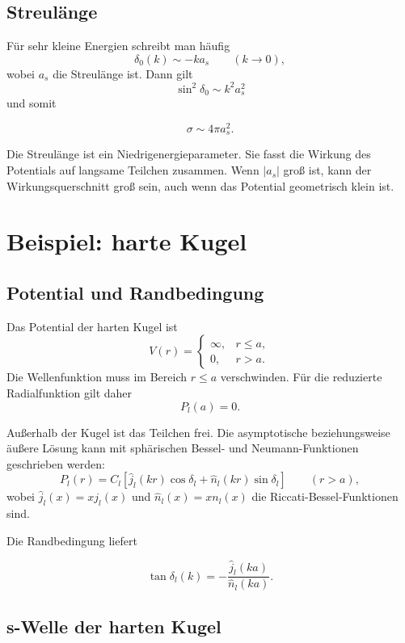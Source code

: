 \subsection{Streulänge}

Für sehr kleine Energien schreibt man häufig
\[
    \delta_0(k)\sim -ka_s
    \qquad (k\to 0),
\]
wobei \(a_s\) die Streulänge ist. Dann gilt
\[
    \sin^2\delta_0\sim k^2a_s^2
\]
und somit
\begin{formulabox}
\[
    \sigma\sim 4\pi a_s^2.
\]
\end{formulabox}

\begin{conceptbox}
Die Streulänge ist ein Niedrigenergieparameter. Sie fasst die Wirkung des Potentials auf langsame Teilchen zusammen. Wenn \(|a_s|\) groß ist, kann der Wirkungsquerschnitt groß sein, auch wenn das Potential geometrisch klein ist.
\end{conceptbox}

\section{Beispiel: harte Kugel}

\subsection{Potential und Randbedingung}

Das Potential der harten Kugel ist
\[
    V(r)=
    \begin{cases}
        \infty, & r\le a,\\
        0, & r>a.
    \end{cases}
\]
Die Wellenfunktion muss im Bereich \(r\le a\) verschwinden. Für die reduzierte Radialfunktion gilt daher
\[
    P_l(a)=0.
\]

Außerhalb der Kugel ist das Teilchen frei. Die asymptotische beziehungsweise äußere Lösung kann mit sphärischen Bessel- und Neumann-Funktionen geschrieben werden:
\[
    P_l(r)=C_l\left[\hat j_l(kr)\cos\delta_l+\hat n_l(kr)\sin\delta_l\right]
    \qquad (r>a),
\]
wobei \(\hat j_l(x)=xj_l(x)\) und \(\hat n_l(x)=xn_l(x)\) die Riccati-Bessel-Funktionen sind.

Die Randbedingung liefert
\begin{formulabox}
\[
    \tan\delta_l(k)=-\frac{\hat j_l(ka)}{\hat n_l(ka)}.
\]
\end{formulabox}

\subsection{s-Welle der harten Kugel}

